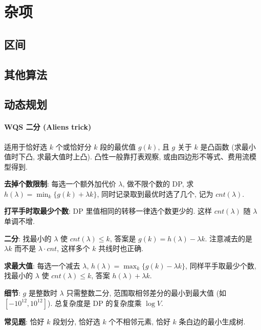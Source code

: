 \section{杂项}

\subsection{区间}

\subsection{其他算法}

\subsection{动态规划}

\paragraph{WQS 二分 (Aliens trick)}
适用于恰好选 $k$ 个或恰好分 $k$ 段的最优值 $g(k)$, 且 $g$ 关于 $k$ 是凸函数 (求最小值时下凸, 求最大值时上凸). 凸性一般靠打表观察, 或由四边形不等式、费用流模型得到.
\begin{compactitem}
\item \textbf{去掉个数限制}: 每选一个额外加代价 $\lambda$, 做不限个数的 DP, 求 $h(\lambda)=\min_k\{g(k)+\lambda k\}$, 同时记录取到最优时选了几个, 记为 $\mathit{cnt}(\lambda)$.
\item \textbf{打平手时取最少个数}: DP 里值相同的转移一律选个数更少的. 这样 $\mathit{cnt}(\lambda)$ 随 $\lambda$ 单调不增.
\item \textbf{二分}: 找最小的 $\lambda$ 使 $\mathit{cnt}(\lambda)\le k$, 答案是 $g(k)=h(\lambda)-\lambda k$. 注意减去的是 $\lambda k$ 而不是 $\lambda\cdot\mathit{cnt}$, 这样多个 $k$ 共线时也正确.
\item \textbf{求最大值}: 每选一个减去 $\lambda$, $h(\lambda)=\max_k\{g(k)-\lambda k\}$, 同样平手取最少个数, 找最小的 $\lambda$ 使 $\mathit{cnt}(\lambda)\le k$, 答案 $h(\lambda)+\lambda k$.
\item \textbf{细节}: $g$ 是整数时 $\lambda$ 只需整数二分, 范围取相邻差分的最小到最大值 (如 $[-10^{12},10^{12}]$). 总复杂度是 DP 的复杂度乘 $\log V$.
\item \textbf{常见题}: 恰好 $k$ 段划分, 恰好选 $k$ 个不相邻元素, 恰好 $k$ 条白边的最小生成树.
\end{compactitem}

